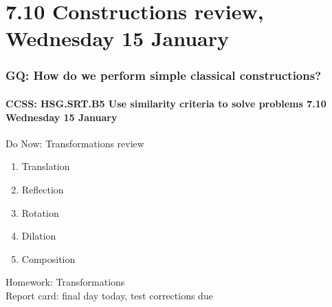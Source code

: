 \documentclass{beamer}
\begin{document}
\section{7.10 Constructions review, Wednesday 15 January}
\frame
{
  \frametitle{GQ: How do we perform simple classical constructions?}
  \framesubtitle{CCSS: HSG.SRT.B5 Use similarity criteria to solve problems \hfill \alert{7.10 Wednesday 15 January}}

  \begin{block}{Do Now: Transformations review}
  \begin{enumerate}
    \item Translation
    \item Reflection
    \item Rotation
    \item Dilation
    \item Composition
  \end{enumerate}
  \end{block}
  Homework: Transformations \\[0.25cm]
  \alert{Report card: final day today, test corrections due}
}
\end{document}
